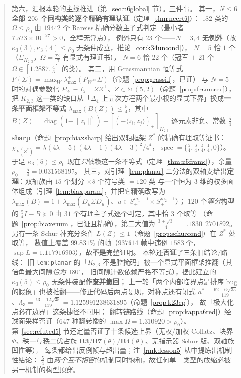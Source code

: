 \documentclass[UTF8,11pt]{ctexart}
\theoremstyle{definition}
\newcommand{\Lam}{\Lambda}
\begin{document}
\begin{abstract}
第六，汇报本轮的主线推进（第~\ref{sec:n6global} 节）。三件事。
其一，\textbf{$N\le6$ 全部 $205$ 个同构类的逐个精确有理认证}（定理~\ref{thm:ncert6}）：
$182$ 类的 $\Omega\le\rho_0$ 由 $19442$ 个 Bareiss 精确分数主子式判定（最小者 $7.523\times10^{-37}>0$，全程无浮点），
例外只有 $23$ 个——$N=3,4$ \textbf{无例外}（故 $\kappa_3(3),\kappa_3(4)\le\rho_0$ 无条件成立，推论~\ref{cor:k34uncond}），
$N=5$ 恰 $1$ 个（$\Sigma_{K_{2,3}}$，$\Omega=\frac{22}{17}$ 有显式有理证书），
$N=6$ 恰 $22$ 个（冠军 $+$ $21$ 个 $\Omega\in[1.2887,\frac43]$ 的类）。
其二，用 Grassmannian 恒等式 $F(\Sigma)=\max_W\lambda^+_{\max}(P_W\circ\Sigma)$（命题~\ref{prop:grassid}，已证）
与 $N=5$ 时的对偶参数化 $P_W=I_5-ZZ^\top$、$Z\in\mathrm{St}(5,2)$（命题~\ref{prop:framered}），
把 $K_{2,3}$ 这一类的缺口从「$\Delta_4$ 上五次方程两个最小根的显式下界」换成\textbf{一条平面框架不等式}
$\lambda_{\max}(B(Z))\le\frac54$，其中 $B(Z)=\operatorname{diag}(1-\|z_i\|^2)+[(-\langle z_i,z_j\rangle)_+]_{K_{2,3}}$
逐元素非负、常数 $\frac54$ \textbf{sharp}（命题~\ref{prop:biaxsharp} 给出双轴框架 $Z^\ast$ 的精确有理取等证书：
$\chi_{B(Z^\ast)}=\lambda(4\lambda-5)(4\lambda-1)(4\lambda-3)^2/4^4$，$\operatorname{spec}=\{\frac54,\frac34,\frac34,\frac14,0\}$）。
于是 $\kappa_3(5)\le\rho_0$ 现在\emph{只}依赖这一条不等式（定理~\ref{thm:n5frame}），余量 $\rho_0-\frac54=0.031568197$。
其三，对引理~\ref{lem:planar} 二分法的双轴支给出\textbf{定理}：双轴族由 $15$ 个划分 $\times8$ 个符号类 $=120$ 类
与一个恒为 $3$ 维的权多面体组成（引理~\ref{lem:biaxparam}，并把它精确改写为
$\lambda_{\max}(B)=1+\lambda_{\max}(D_u\widetilde\Sigma D_u)$、$u\in S^{m_1-1}_+\times S^{m_2-1}_+$）；
$120$ 个\emph{等分}构型的 $\frac54I-B\succeq0$ 由 $31$ 个有理主子式逐个判定，其中恰 $3$ 个取等
（命题~\ref{prop:biaxenum}，已证且精确），第二大值为 $\frac{3+\sqrt3}4=1.183012701892$。
另有一条 Schur 补充分条件 $L(Z)\le1$（命题~\ref{prop:schurcond}）在 $Z^\ast$ 处取等，
数值上覆盖 $99.831\%$ 的帧（$937614$ 帧中违例 $1583$ 个，$\sup L=1.117916903$），故\textbf{不是}完整证明。
本轮还\textbf{否证}了三条旧结论/路线：
旧 \texttt{lem:planar} 的「$K_{2,3}$ 不是腔掩码」被一个显式平面框架推翻（其倍角最大间隙\emph{恰为} $180^\circ$，
旧间隙计数依赖严格不等式），据此建立的 $\kappa_3(5)\le\rho_0$ 无条件装配\textbf{作废并撤回}；
上一轮「两个内部临界点是排序 bug 的假象」也被推翻——修正代码后两点复现，对称点还有闭式
$a^\ast=\frac{62-6\sqrt{35}}{119}$、$\Lam_3=\frac{63+12\sqrt{35}}{119}=1.125991238631895$（命题~\ref{prop:k23cp}），
故「极大化点必在边界」这条捷径不可用；
翻转链路线（命题~\ref{prop:kappa6red}）经球面采样否证（$647$ 种翻转像的 $\max\Omega=1.310920>\rho_0$）。
第~\ref{sec:refuted5} 节还定量否证了十条候选上界（无权/加权 Collatz、块界 $\Psi$、秩一与秩二优占族
$\mathbf{B3}/\mathbf{B7}(\theta)/\mathbf{B4}(\theta)$、无指示器 Schur 版、双轴族凹性等），
每条都给出反例帧与超出量；注~\ref{rmk:lesson5} 从中提炼出机制性结论：
$\frac54$ 由\emph{两个互不相容}的机制同时饱和，故任何单一类型的放缩必被另一机制的构型顶穿。


\end{abstract}
\end{document}

